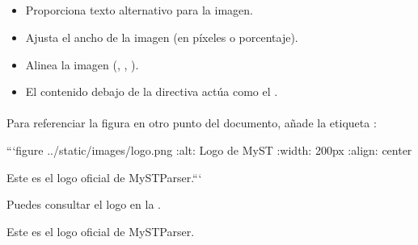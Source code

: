 \documentclass[a4paper,10pt,spanish]{sphinxmanual}
\begin{document}
\subparagraph{}
\label{\detokenize{configuracion_inicial/013.guia_de_myst_parser:explicacion}}\begin{itemize}
\item {} 
\sphinxAtStartPar
{} Proporciona texto alternativo para la imagen.

\item {} 
\sphinxAtStartPar
{} Ajusta el ancho de la imagen (en píxeles o porcentaje).

\item {} 
\sphinxAtStartPar
{} Alinea la imagen (, , ).

\item {} 
\sphinxAtStartPar
El contenido debajo de la directiva actúa como el .

\end{itemize}


\paragraph{}
\label{\detokenize{configuracion_inicial/013.guia_de_myst_parser:referencia-cruzada-a-una-figura}}
\sphinxAtStartPar
Para referenciar la figura en otro punto del documento, añade la etiqueta :

\begin{sphinxVerbatim}[commandchars=\\\{\}]
  ```\PYGZob{}figure\PYGZcb{} ../\PYGZus{}static/images/logo.png
  :alt: Logo de MyST
  :width: 200px
  :align: center

  Este es el logo oficial de MyST\PYGZhy{}Parser.```
\end{sphinxVerbatim}

\sphinxAtStartPar
Puedes consultar el logo en la {\hyperref[\detokenize{configuracion_inicial/013.guia_de_myst_parser:fig-logo}]{}}.\textasciigrave{}

\sphinxAtStartPar
{}

\sphinxAtStartPar
{}

\sphinxAtStartPar
{} Este es el logo oficial de MyST\sphinxhyphen{}Parser.
\end{document}
